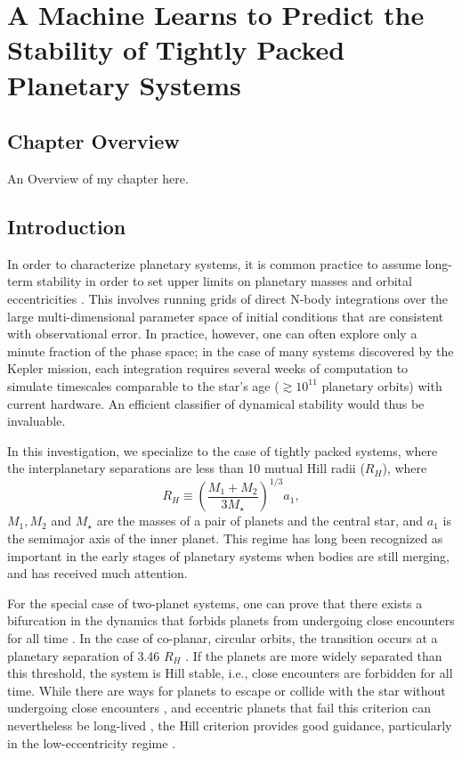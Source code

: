 \chapter[Stability of Planetary Systems]{A Machine Learns to Predict the Stability of Tightly Packed Planetary Systems}

\section{Chapter Overview}

An Overview of my chapter here.

\section{Introduction}
In order to characterize planetary systems, it is common practice to assume long-term stability in order to set upper limits on planetary masses and orbital eccentricities \citep[e.g.][]{Lissauer11, Steffen13, Tamayo14b, Tamayo15}.
This involves running grids of direct N-body integrations over the large multi-dimensional parameter space of initial conditions that are consistent with observational error.
In practice, however, one can often explore only a minute fraction of the phase space; in the case of many systems discovered by the Kepler mission, each integration requires several weeks of computation to simulate timescales comparable to the star's age ($\gtrsim 10^{11}$ planetary orbits) with current hardware.
An efficient classifier of dynamical stability would thus be invaluable.

In this investigation, we specialize to the case of tightly packed systems, where the interplanetary separations are less than 10 mutual Hill radii ($R_H$), where
\begin{equation}
R_H \equiv \left(\frac{M_1+M_2}{3M_\star} \right)^{1/3} a_1,
\end{equation}
$M_1, M_2$ and $M_\star$ are the masses of a pair of planets and the central star, and $a_1$ is the semimajor axis of the inner planet.
This regime has long been recognized as important in the early stages of planetary systems when bodies are still merging, and has received much attention.

For the special case of two-planet systems, one can prove that there exists a bifurcation in the dynamics that forbids planets from undergoing close encounters for all time \citep{Marchal82, Milani83}.
In the case of co-planar, circular orbits, the transition occurs at a planetary separation of 3.46 $R_H$ \citep{Gladman93}.
If the planets are more widely separated than this threshold, the system is Hill stable, i.e., close encounters are forbidden for all time.
While there are ways for planets to escape or collide with the star without undergoing close encounters \citep[e.g.,][]{Deck12, Veras13hill}, and eccentric planets that fail this criterion can nevertheless be long-lived \citep[e.g.,][]{Gladman93}, the Hill criterion provides good guidance, particularly in the low-eccentricity regime \citep{Barnes06}.

